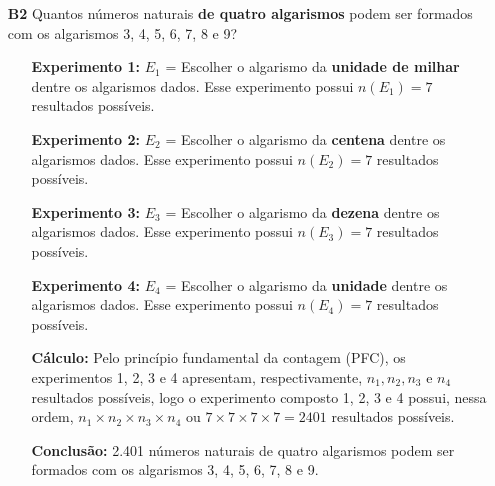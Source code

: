 \documentclass[a4paper,12pt]{article}
\begin{document}
\begin{enumerate}
\item[\textbf{B2}] Quantos números naturais \textbf{de quatro algarismos} podem ser formados com os algarismos 3, 4, 5, 6, 7, 8 e 9?
 \begin{itemize}
     \item[\ding{172}] \textbf{Experimento 1:} $E_1$ = Escolher o algarismo da \textbf{unidade de milhar} dentre os algarismos dados. Esse experimento possui $n(E_1) = 7$ resultados possíveis.
     \item[\ding{173}] \textbf{Experimento 2:} $E_2$ = Escolher o algarismo da \textbf{centena} dentre os algarismos dados. Esse experimento possui $n(E_2) = 7$ resultados possíveis.
     \item[\ding{174}] \textbf{Experimento 3:} $E_3$ = Escolher o algarismo da \textbf{dezena} dentre os algarismos dados. Esse experimento possui $n(E_3) = 7$ resultados possíveis.
     \item[\ding{175}] \textbf{Experimento 4:} $E_4$ = Escolher o algarismo da \textbf{unidade} dentre os algarismos dados. Esse experimento possui $n(E_4) = 7$ resultados possíveis.    
     \item[\ding{176}] \textbf{Cálculo:} Pelo princípio fundamental da contagem (PFC), os experimentos 1, 2, 3 e 4 apresentam, respectivamente, $n_{1}, n_{2}, n_{3} \textrm{ e } n_{4}$ resultados possíveis, logo o experimento composto 1, 2, 3 e 4 possui, nessa ordem, $n_{1} \times n_{2} \times n_{3} \times n_{4}$ ou $7 \times 7 \times 7 \times 7 = 2401$ resultados possíveis.
     \item[\ding{177}] \textbf{Conclusão:} 2.401 números naturais de quatro algarismos podem ser formados com os algarismos 3, 4, 5, 6, 7, 8 e 9. 
   \end{itemize}


\end{enumerate}
\end{document}
